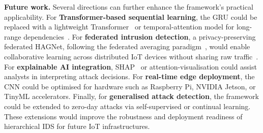 \documentclass{llncs}
\begin{document}
\noindent\textbf{Future work.} Several directions can further enhance the framework's practical applicability. For \textbf{Transformer-based sequential learning}, the GRU could be replaced with a lightweight Transformer~\cite{ref20} or temporal-attention model for long-range dependencies~\cite{ref4}. For \textbf{federated intrusion detection}, a privacy-preserving federated HAGNet, following the federated averaging paradigm~\cite{ref21}, would enable collaborative learning across distributed IoT devices without sharing raw traffic~\cite{ref3}. For \textbf{explainable AI integration}, SHAP~\cite{ref22} or attention-visualisation could assist analysts in interpreting attack decisions. For \textbf{real-time edge deployment}, the CNN could be optimised for hardware such as Raspberry Pi, NVIDIA Jetson, or TinyML accelerators. Finally, for \textbf{generalised attack detection}, the framework could be extended to zero-day attacks via self-supervised or continual learning. These extensions would improve the robustness and deployment readiness of hierarchical IDS for future IoT infrastructures.
\end{document}
